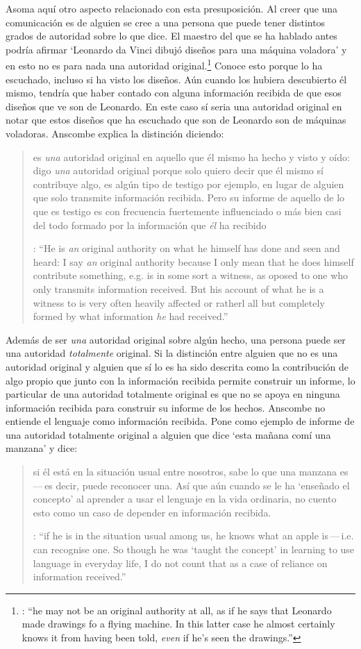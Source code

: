 Asoma aquí otro aspecto relacionado con esta presuposición. Al creer que una comunicación es de alguien se cree a una persona que puede tener distintos grados de autoridad sobre lo que dice. El maestro del que se ha hablado antes podría afirmar \enquote*{Leonardo da Vinci dibujó diseños para una máquina voladora} y en esto no es para nada una autoridad original.\footnote{\cite[Cf.~][6]{anscombe2008faith:tobelieve}: \enquote{he may not be an original authority at all, as if he says that Leonardo made drawings fo a flying machine. In this latter case he almost certainly knows it from having been told, \emph{even} if he's seen the drawings.}} Conoce esto porque lo ha escuchado, incluso si ha visto los diseños. Aún cuando los hubiera descubierto él mismo, tendría que haber contado con alguna información recibida de que esos diseños que ve son de Leonardo. En este caso sí seria una autoridad original en notar que estos diseños que ha escuchado que son de Leonardo son de máquinas voladoras. Anscombe explica la distinción diciendo: \blockquote[{\cite[5]{anscombe2008faith:tobelieve}}: \enquote{He is \emph{an} original authority on what he himself has done and seen and heard: I say \emph{an} original authority because I only mean that he does himself contribute something, e.g. is in some sort a witness, as oposed to one who only transmits information received. But his account of what he is a witness to is very often \textelp{} heavily affected or ratherl all but completely formed by what information \emph{he} had received.}]{ es \emph{una} autoridad original en aquello que él mismo ha hecho y visto y oído: digo \emph{una} autoridad original porque solo quiero decir que él mismo sí contribuye algo, es algún tipo de testigo por ejemplo, en lugar de alguien que solo transmite información recibida. Pero su informe de aquello de lo que es testigo es con frecuencia \textelp{} fuertemente influenciado o más bien casi del todo formado por la información que \emph{él} ha recibido} Además de ser \emph{una} autoridad original sobre algún hecho, una persona puede ser una autoridad \emph{totalmente} original. Si la distinción entre alguien que no es una autoridad original y alguien que sí lo es ha sido descrita como la contribución de algo propio que junto con la información recibida permite construir un informe, lo particular de una autoridad totalmente original es que no se apoya en ninguna información recibida para construir su informe de los hechos. Anscombe no entiende el lenguaje como información recibida. Pone como ejemplo de informe de una autoridad totalmente original a alguien que dice \enquote*{esta mañana comí una manzana} y dice: \blockquote[{\cite[6]{anscombe2008faith:tobelieve}}: \enquote{if he is in the situation usual among us, he knows what an apple is\,---\,i.e. can recognise one. So though he was `taught the concept' in learning to use language in everyday life, I do not count that as a case of reliance on information received.}]{si él está en la situación usual entre nosotros, sabe lo que una manzana es\,---\,es decir, puede reconocer una. Así que aún cuando se le ha `enseñado el concepto' al aprender a usar el lenguaje en la vida ordinaria, no cuento esto como un caso de depender en información recibida.}

